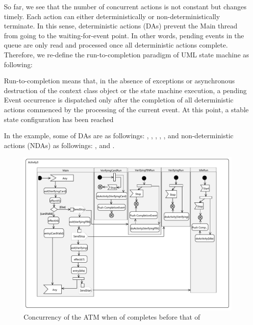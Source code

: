 So far, we see that the number of concurrent actions is not constant but changes timely. 
Each action can either deterministically or non-deterministically terminate. 
In this sense, deterministic actions (DAs) prevent the Main thread from going to the waiting-for-event point. 
In other words, pending events in the queue are only read and processed once all deterministic actions complete. Therefore, we re-define the run-to-completion paradigm of UML state machine as following:
 
\begin{definition}
	Run-to-completion means that, in the absence of exceptions or asynchronous destruction of the context	class object or the state machine execution, a pending Event occurrence is dispatched only after the completion of all deterministic actions commenced by the processing of the current event. 
	At this point, a stable state configuration has been reached
\end{definition}

In the example, some of DAs are as followings: , , , , ,  and non-deterministic actions (NDAs) as followings: ,  and .


\begin{figure}
	\centering
	\includegraphics[clip, trim=1.5cm 1.6cm 1.6cm 1cm, width=1.03\columnwidth]{figures/ThreadingExample2.pdf}
	\caption{Concurrency of the ATM when  of  completes before that of }
	\label{fig:threading2}
\end{figure}

